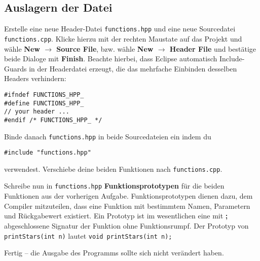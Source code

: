 
\subsection{Auslagern der Datei}
Erstelle eine neue Header-Datei \texttt{functions.hpp} und eine neue Sourcedatei \texttt{functions.cpp}.
Klicke hierzu mit der rechten Maustate auf das Projekt und wähle \textbf{New $\rightarrow$ Source File}, bzw. wähle \textbf{New $\rightarrow$ Header File} und bestätige beide Dialoge mit \textbf{Finish}.
Beachte hierbei, dass Eclipse automatisch Include-Guards in der Headerdatei erzeugt, die das mehrfache Einbinden desselben Headers verhindern:

\begin{lstlisting}
#ifndef FUNCTIONS_HPP_
#define FUNCTIONS_HPP_
// your header ...
#endif /* FUNCTIONS_HPP_ */
\end{lstlisting}

Binde danach \texttt{functions.hpp} in beide Sourcedateien ein indem du

\begin{lstlisting}
#include "functions.hpp"
\end{lstlisting}

verwendest.
Verschiebe deine beiden Funktionen nach \texttt{functions.cpp}.

Schreibe nun in \texttt{functions.hpp} \textbf{Funktionsprototypen} für die beiden Funktionen aus der vorherigen Aufgabe.
Funktionsprototypen dienen dazu, dem Compiler mitzuteilen, dass eine Funktion mit bestimmtem Namen, Parametern und Rückgabewert existiert.
Ein Prototyp ist im wesentlichen eine mit \textbf{;} abgeschlossene Signatur der Funktion ohne Funktionsrumpf.
Der Prototyp von \texttt{printStars(int n)} lautet \texttt{void printStars(int n);}

Fertig -- die Ausgabe des Programms sollte sich nicht verändert haben.


